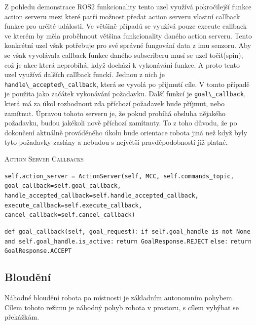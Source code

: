 Z pohledu demonstrace ROS2 funkcionality tento uzel využívá pokročilejší funkce action serveru mezi které patří možnost předat action serveru vlastní callback funkce pro určité události. Ve většině případů se využívá pouze execute callback ve kterém by měla proběhnout většina funkcionality daného action serveru. Tento konkrétní uzel však potřebuje pro své správné fungování data z imu senzoru. Aby se však vyvolávala callback funkce daného subscriberu musí se uzel točit(spin), což je akce která neprobíhá, když dochází k vykonávání funkce. A proto tento uzel využívá dalších callback funckí. Jednou z nich je \verb|handle\_accepted\_callback|, která se vyvolá po přijmutí cíle. V tomto případě je použita jako začátek vykonávání požadavku. Další funkcí je \verb|goal\_callback|, která má za úkol rozhodnout zda příchozí požadavek bude příjmut, nebo zamítnut. Úpravou tohoto serveru je, že pokud probíhá obsluha nějakého požadavku, budou jakékoli nově příchozí zamítnuty. To z toho důvodu, že po dokončení aktuálně prováděného úkolu bude orientace robota jiná než když byly tyto požadavky zaslány a nebudou s největší pravděpodobností již platné.

\begin{algorithm}[h!]
	\label{}
	\caption{\textsc{Action Server Callbacks}}
	
	\DontPrintSemicolon
	\SetAlgoNoLine
	\SetNlSty{}{}{:}
	\SetNlSkip{-1.1em}
	
	\BlankLine \Indp\Indpp
	
	\texttt{self.action\_server = ActionServer(self, MCC, self.commands\_topic,}\;
	\Indp\Indp
	\texttt{goal\_callback=self.goal\_callback,}\;
	\texttt{handle\_accepted\_callback=self.handle\_accepted\_callback,}\;
	\texttt{execute\_callback=self.execute\_callback,}\;
	\texttt{cancel\_callback=self.cancel\_callback)}\;
	\Indm\Indm

	\BlankLine
	\texttt{def goal\_callback(self, goal\_request):}\;
	\Indp\Indp
	\texttt{if self.goal\_handle is not None and self.goal\_handle.is\_active:}\;
	\Indp\Indp
	\texttt{return GoalResponse.REJECT}\;
	\Indm\Indm
	\texttt{else:}\;
	\Indp\Indp
	\texttt{return GoalResponse.ACCEPT}\;

\end{algorithm}

\subsection*{Bloudění}
Náhodné bloudění robota po místnosti je základním autonomním pohybem. Cílem tohoto režimu je náhodný pohyb robota v prostoru, s cílem vyhýbat se překážkám.


